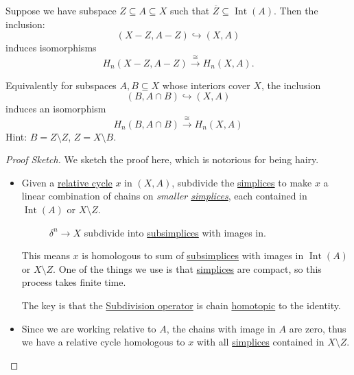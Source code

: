 \begin{theorem}[Excision]\label{thm:excision}
	Suppose we have subspace \(Z \subseteq A \subseteq X\) such that \(\overline{Z} \subseteq \operatorname{Int} (A)\). Then the inclusion:
	\[
		(X - Z, A - Z) \hookrightarrow (X, A)
	\]
	induces isomorphisms
	\[
		H_n(X - Z, A - Z) \xrightarrow{\cong} H_n(X, A).
	\]
\end{theorem}

\begin{exercise}
	Equivalently for subspaces \(A, B \subseteq X\) whose interiors cover \(X\), the inclusion
	\[
		(B, A \cap B) \hookrightarrow (X, A)
	\]
	induces an isomorphism
	\[
		H_n(B, A \cap B) \xrightarrow{\cong} H_n(X, A)
	\]
	Hint: \(B = Z \setminus Z\), \(Z = X \setminus B\).
\end{exercise}
\begin{figure}[H]
	\centering
	\label{fig:eg:excision-1}
\end{figure}

\begin{proof}[Proof Sketch]
	We sketch the proof here, which is notorious for being hairy.
	\begin{itemize}
		\item Given a \hyperref[def:relative-cycle]{relative cycle} $x$ in $(X, A)$, subdivide the \hyperref[def:standard-simplex]{simplices} to make $x$ a
		      linear combination of chains on \emph{smaller \hyperref[def:standard-simplex]{simplices}}, each contained in $\operatorname{Int}(A)$ or $X \setminus Z$.
		      \begin{figure}[H]
			      \centering
			      \caption{\(\delta ^n\to X\) subdivide into \hyperref[def:subsimplex]{subsimplices} with images in. }
			      \label{fig:pf:excision}
		      \end{figure}
		      This means $x$ is homologous to sum of \hyperref[def:subsimplex]{subsimplices} with images in $\operatorname{Int}(A)$ or $X \setminus Z$. One of the things we
		      use is that \hyperref[def:standard-simplex]{simplices} are compact, so this process takes finite time.

		      The key is that the \underline{Subdivision operator} is chain \hyperref[def:homotopic]{homotopic} to the identity.
		\item Since we are working relative to $A$, the chains with image in $A$ are zero, thus we have a relative cycle homologous to $x$
		      with all \hyperref[def:standard-simplex]{simplices} contained in $X \setminus Z$.
	\end{itemize}
\end{proof}


